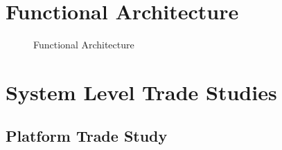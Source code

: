 \documentclass{article}
\begin{document}
\section{Functional Architecture}
\begin{figure}[H]
\centering
\def\svgwidth{\columnwidth}

\caption{Functional Architecture}
\label{fig:functional}
\end{figure}


\section{System Level Trade Studies}
	\subsection{Platform Trade Study}
\end{document}
